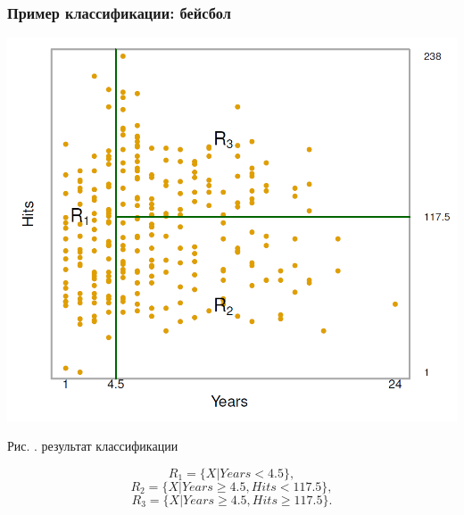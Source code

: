 \documentclass[pdf, 9pt, usenames, dvipsnames, unicode, hyperref={bookmarks=true,bookmarksopen=false, bookmarksnumbered}]{beamer}
\begin{document}
\begin{frame}\frametitle{Пример классификации: бейсбол}

\begin{center}
	\includegraphics[scale=0.3]{pic65}
\end{center}

    \begin{center}
	Рис. . результат классификации
    \end{center}

$$R_1 = \{ X | Years < 4.5 \},$$
$$R_2 = \{ X | Years \geq 4.5, Hits < 117.5 \},$$
$$R_3 = \{ X | Years \geq 4.5, Hits \geq 117.5 \}.$$

\end{frame}

\end{document}
